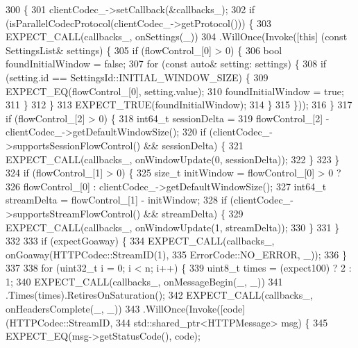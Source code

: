 \begin{DoxyCode}
300                                                                           \{
301     clientCodec_->setCallback(&callbacks_);
302     \textcolor{keywordflow}{if} (isParallelCodecProtocol(clientCodec_->getProtocol())) \{
303       EXPECT\_CALL(callbacks_, onSettings(\_))
304         .WillOnce(Invoke([\textcolor{keyword}{this}] (\textcolor{keyword}{const} SettingsList& settings) \{
305               \textcolor{keywordflow}{if} (flowControl_[0] > 0) \{
306                 \textcolor{keywordtype}{bool} foundInitialWindow = \textcolor{keyword}{false};
307                 \textcolor{keywordflow}{for} (\textcolor{keyword}{const} \textcolor{keyword}{auto}& setting: settings) \{
308                   \textcolor{keywordflow}{if} (setting.id == SettingsId::INITIAL\_WINDOW\_SIZE) \{
309                     EXPECT\_EQ(flowControl\_[0], setting.value);
310                     foundInitialWindow = true;
311                   \}
312                 \}
313                 EXPECT\_TRUE(foundInitialWindow);
314               \}
315             \}));
316     \}
317     \textcolor{keywordflow}{if} (flowControl_[2] > 0) \{
318       int64\_t sessionDelta =
319         flowControl_[2] - clientCodec_->getDefaultWindowSize();
320       \textcolor{keywordflow}{if} (clientCodec_->supportsSessionFlowControl() && sessionDelta) \{
321         EXPECT\_CALL(callbacks_, onWindowUpdate(0, sessionDelta));
322       \}
323     \}
324     \textcolor{keywordflow}{if} (flowControl_[1] > 0) \{
325       \textcolor{keywordtype}{size\_t} initWindow = flowControl_[0] > 0 ?
326         flowControl_[0] : clientCodec_->getDefaultWindowSize();
327       int64\_t streamDelta = flowControl_[1] - initWindow;
328       \textcolor{keywordflow}{if} (clientCodec_->supportsStreamFlowControl() && streamDelta) \{
329         EXPECT\_CALL(callbacks_, onWindowUpdate(1, streamDelta));
330       \}
331     \}
332 
333     \textcolor{keywordflow}{if} (expectGoaway) \{
334       EXPECT\_CALL(callbacks_, onGoaway(HTTPCodec::StreamID(1),
335                                       ErrorCode::NO\_ERROR, \_));
336     \}
337 
338     \textcolor{keywordflow}{for} (uint32\_t i = 0; i < n; i++) \{
339       uint8\_t times = (expect100) ? 2 : 1;
340       EXPECT\_CALL(callbacks_, onMessageBegin(\_, \_))
341         .Times(times).RetiresOnSaturation();
342       EXPECT\_CALL(callbacks_, onHeadersComplete(\_, \_))
343         .WillOnce(Invoke([code] (HTTPCodec::StreamID,
344                                  std::shared\_ptr<HTTPMessage> msg) \{
345                            EXPECT\_EQ(msg->getStatusCode(), code);

\end{DoxyCode}
